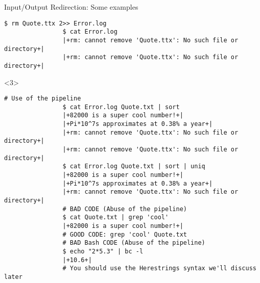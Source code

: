 \begin{frame}[fragile]{Input/Output Redirection: Some examples}
\begin{overlayarea}{\textwidth}{0.7\textheight}
\begin{onlyenv}
\begin{lstlisting}[style=MyBash, aboveskip=2mm, firstnumber=19]
                $ rm Quote.ttx 2>> Error.log
                $ cat Error.log
                |+rm: cannot remove 'Quote.ttx': No such file or directory+|
                |+rm: cannot remove 'Quote.ttx': No such file or directory+|
            \end{lstlisting}
        \end{onlyenv}
        \begin{onlyenv}<3>
            \begin{lstlisting}[style=MyBash, aboveskip=2mm, firstnumber=37]
                # Use of the pipeline
                $ cat Error.log Quote.txt | sort
                |+82000 is a super cool number!+|
                |+Pi*10^7s approximates at 0.38% a year+|
                |+rm: cannot remove 'Quote.ttx': No such file or directory+|
                |+rm: cannot remove 'Quote.ttx': No such file or directory+|
                $ cat Error.log Quote.txt | sort | uniq
                |+82000 is a super cool number!+|
                |+Pi*10^7s approximates at 0.38% a year+|
                |+rm: cannot remove 'Quote.ttx': No such file or directory+|
                # BAD CODE (Abuse of the pipeline)
                $ cat Quote.txt | grep 'cool'
                |+82000 is a super cool number!+|
                # GOOD CODE: grep 'cool' Quote.txt
                # BAD Bash CODE (Abuse of the pipeline)
                $ echo "2*5.3" | bc -l
                |+10.6+|
                # You should use the Herestrings syntax we'll discuss later
            \end{lstlisting}
        \end{onlyenv}
    \end{overlayarea}
\end{frame}
